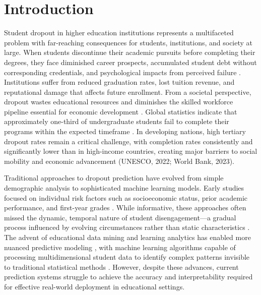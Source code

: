 \documentclass[journal]{IEEEtran}
\begin{document}
\section{Introduction}

Student dropout in higher education institutions represents a multifaceted problem with far-reaching consequences for students, institutions, and society at large. When students discontinue their academic pursuits before completing their degrees, they face diminished career prospects, accumulated student debt without corresponding credentials, and psychological impacts from perceived failure \cite{rahmani2024dropout,pelima2024predicting}. Institutions suffer from reduced graduation rates, lost tuition revenue, and reputational damage that affects future enrollment. From a societal perspective, dropout wastes educational resources and diminishes the skilled workforce pipeline essential for economic development \cite{kaplan1977dropout,wirba2022transforming}. Global statistics indicate that approximately one-third of undergraduate students fail to complete their programs within the expected timeframe \cite{fia2022higher}. In developing nations, high tertiary dropout rates remain a critical challenge, with completion rates consistently and significantly lower than in high-income countries, creating major barriers to social mobility and economic advancement (UNESCO, 2022; World Bank, 2023).

Traditional approaches to dropout prediction have evolved from simple demographic analysis to sophisticated machine learning models. Early studies focused on individual risk factors such as socioeconomic status, prior academic performance, and first-year grades \cite{wolniak2010academic, reynolds2020factors}. While informative, these approaches often missed the dynamic, temporal nature of student disengagement---a gradual process influenced by evolving circumstances rather than static characteristics \cite{lopez2024dynamics}. The advent of educational data mining and learning analytics has enabled more nuanced predictive modeling \cite{shafiq2022student,susnjak2024beyond}, with machine learning algorithms capable of processing multidimensional student data to identify complex patterns invisible to traditional statistical methods \cite{balachandar2025multi,nath2025smart}. However, despite these advances, current prediction systems struggle to achieve the accuracy and interpretability required for effective real-world deployment in educational settings.
\end{document}
